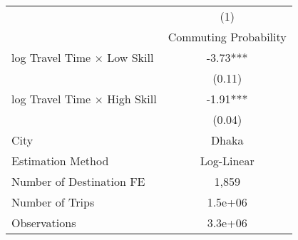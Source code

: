 {
\def\sym#1{\ifmmode^{#1}\else\(^{#1}\)\fi}
\begin{tabular}{l*{1}{c}}
\toprule
            &\multicolumn{1}{c}{(1)}\\
            &\multicolumn{1}{c}{Commuting Probability}\\
\addlinespace\addlinespace
log Travel Time $\times$ Low Skill&       -3.73***\\
            &      (0.11)   \\
\addlinespace
log Travel Time $\times$ High Skill&       -1.91***\\
            &      (0.04)   \\
\addlinespace\addlinespace
City        &       Dhaka   \\
Estimation Method&  Log-Linear   \\
Number of Destination FE&       1,859   \\
Number of Trips&     1.5e+06   \\
Observations&     3.3e+06   \\
\bottomrule
\end{tabular}
}
